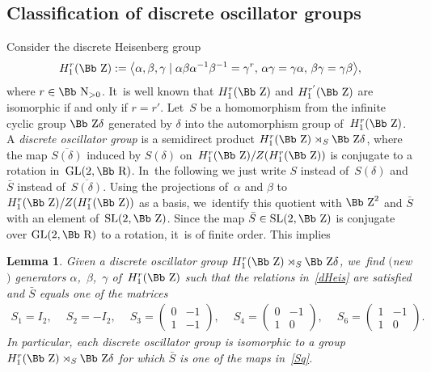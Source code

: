 \documentclass[10pt,a4paper]{amsart}
\newcommand\RR{{\mbox{\Bb R}}}
\newcommand\NN{{\mbox{\Bb N}}}
\newcommand\ZZ{{\mbox{\Bb Z}}}
\newcommand{\GL}{\mathop{{\rm GL}}}
\newcommand{\SL}{\mathop{{\rm SL}}}
\newcommand\la{\langle}
\newcommand\ra{\rangle}
\numberwithin{equation}{section}
\newtheorem{Lemma}[Theorem]{Lemma}
\begin{document}
\subsection{Classification of discrete oscillator groups}
\label{S41}
Consider the discrete Heisenberg group
\begin{gather}\label{dHeis}
H_1^r(\ZZ):=\big\la \alpha, \beta, \gamma \mid \alpha \beta \alpha^{-1} \beta^{-1} =\gamma^r,\, \alpha \gamma=\gamma \alpha,\, \beta\gamma=\gamma\beta\big\ra,
\end{gather}
where $r\in\NN_{>0}$. It~is well known that $H_1^r(\ZZ)$ and $H_1^{r'}(\ZZ)$ are isomorphic if and only if $r=r'$.
Let~$S$ be a homomorphism from the infinite cyclic group $\ZZ \delta$ generated by $\delta$ into the automorphism group of~$H_1^r(\ZZ)$.
A {\it discrete oscillator group} is a semidirect product $H_1^r(\ZZ)\rtimes_S \ZZ \delta$, where the map $\overline{S(\delta)}$ induced by $S(\delta)$ on~$H_1^r(\ZZ)/Z(H_1^r(\ZZ))$ is conjugate to a rotation in~$\GL(2,\RR)$. In~the following we just write $S$ instead of~$S(\delta)$ and $\bar S$ instead of~$\overline{ S(\delta)}$. Using the projections
of~$\alpha$ and $\beta$ to $H_1^r(\ZZ)/Z(H_1^r(\ZZ))$ as a basis, we~identify this quotient with $\ZZ^2$ and $\bar S$ with an element of~$\SL(2,\ZZ)$. Since the map $\bar S\in \SL(2,\ZZ)$ is conjugate over $\GL(2,\RR)$ to a rotation, it~is of finite order. This implies
%
\begin{Lemma}\label{lmgen}
Given a discrete oscillator group $H_1^r(\ZZ)\rtimes_S \ZZ \delta$, we~find $($new$)$ generators $\alpha$,~$\beta$,~$\gamma$ of~$H_1^r(\ZZ)$ such that the relations in~\eqref{dHeis} are satisfied and $\bar S$ equals one of the matrices
\begin{gather}\label{Sq}
S_1=I_2,\quad\
S_2=-I_2,\quad\
S_3= \begin{pmatrix} 0&-1\\1&-1 \end{pmatrix}\!,\quad\
S_4=\begin{pmatrix} 0&-1\\1&0 \end{pmatrix}\!,\quad\
S_6= \begin{pmatrix} 1&-1\\1&0 \end{pmatrix}\!.
\end{gather}
In particular, each discrete oscillator group is isomorphic to a group $H_1^r(\ZZ)\rtimes_S \ZZ \delta$ for which $\bar S$ is one of the maps in~\eqref{Sq}.
\end{Lemma}
\end{document}
